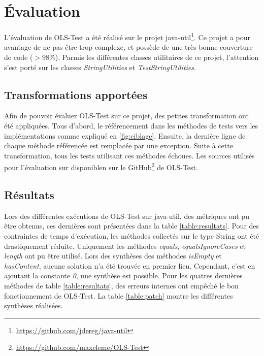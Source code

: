 
\chapter{Évaluation}
	\thispagestyle{document}
	
\par L'évaluation de OLS-Test a été réalisé sur le projet java-util\footnote{\url{https://github.com/jdereg/java-util}}. Ce projet a pour avantage de ne pas être trop complexe, et possède de une très bonne couverture de code ($ >98\% $). Parmis les différentes classes utilitaires de ce projet, l'attention s'est porté sur les classes \textit{StringUtilities} et \textit{TestStringUtilities}.

\section{Transformations apportées}

\par Afin de pouvoir évaluer OLS-Test sur ce projet, des petites transformation ont été appliquées. Tous d'abord, le référencement dans les méthodes de tests vers les implémentations comme expliqué en \ref{fig:ciblage}. Ensuite, la dernière ligne de chaque méthode référencée est remplacée par une exception. Suite à cette transformation, tous les tests utilisant ces méthodes échoues. Les sources utilisés pour l'évaluation sur disponiblen sur le GitHub\footnote{\url{https://github.com/maxcleme/OLS-Test}} de OLS-Test.


\section{Résultats}

\par Lors des différentes exécutions de OLS-Test sur java-util, des métriques ont pu être obtenus, ces dernières sont présentées dans la table \ref{table:resultats}. Pour des contraintes de temps d'exécution, les méthodes collectés sur le type String ont été drastiquement réduite. Uniquement les méthodes \textit{equals}, \textit{equalsIgnoreCases} et \textit{length} ont pu être utilisé. Lors des synthèses des méthodes \textit{isEmpty} et \textit{hasContent}, aucune solution n'a été trouvée en premier lieu. Cependant, c'est en ajoutant la constante \textit{0}, une synthèse est possible. Pour les quatres dernières méthodes de table \ref{table:resultats}, des erreurs internes ont empêché le bon fonctionnement de OLS-Test. La table \ref{table:patch} montre les différentes synthèses réalisées.



